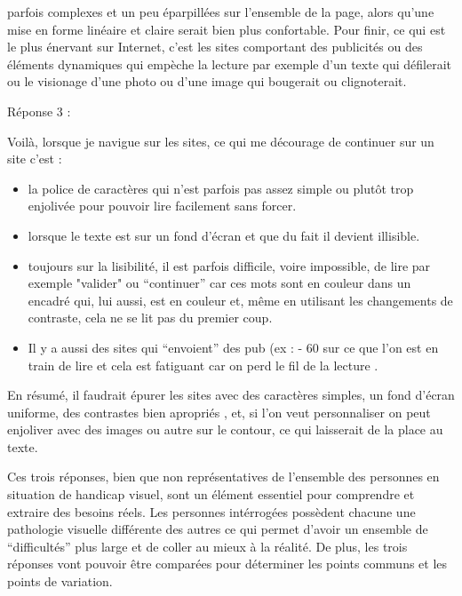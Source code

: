\documentclass[french,a4paper]{report}
\begin{document}
{\begin{center}
{\begin{minipage}{0.9\textwidth}
parfois complexes et un peu éparpillées sur l'ensemble de la
page, alors qu'une mise en forme linéaire et claire serait bien
plus confortable. Pour finir, ce qui est le plus énervant sur
Internet, c'est les sites comportant des publicités ou des
éléments dynamiques qui empèche la lecture par exemple d'un
texte qui défilerait ou le visionage d'une photo ou d'une image
qui bougerait ou clignoterait.
\end{minipage}}
\end{center}
\vspace{0.6cm}
Réponse 3 :
\begin{center}
\colorbox{bck1}{\begin{minipage}{0.9\textwidth} Voilà, lorsque je
navigue sur les sites, ce qui me décourage de continuer sur un
site c'est :
\begin{itemize}\setlength{\itemsep}{0.4\baselineskip}
\item la police de caractères qui n'est parfois pas assez simple ou
plutôt trop enjolivée pour pouvoir lire facilement sans forcer.
\item lorsque le texte est sur un fond d'écran et que du fait il
devient illisible.
\item toujours sur la lisibilité, il est parfois difficile, voire
impossible, de lire par exemple "valider" ou \enquote{continuer} car ces mots
sont en couleur dans un encadré qui, lui aussi, est en couleur et,
même en utilisant les changements de contraste, cela ne se lit pas
du premier coup.
\item Il y a aussi des sites qui \enquote{envoient} des pub (ex : -
60%
sur ce que l'on est en train de lire et cela est fatiguant car on perd le fil de la lecture .\\
\end{itemize}
En résumé, il faudrait épurer les sites avec des caractères simples,
un fond d'écran uniforme, des contrastes bien apropriés , et, si l'on
veut personnaliser on peut enjoliver avec des images ou autre sur le
contour, ce qui laisserait de la place au texte.
\end{minipage}}
\end{center}
\vspace{0.6cm} Ces trois réponses, bien que non représentatives de
l'ensemble des personnes en situation de handicap visuel, sont un élément
essentiel pour comprendre et extraire des besoins réels. Les
personnes intérrogées possèdent chacune une pathologie visuelle
différente des autres ce qui permet d'avoir un ensemble de
\enquote{difficultés} plus large et de coller au mieux à la réalité. De plus,
les trois réponses vont pouvoir être comparées pour déterminer les
points communs et les points de variation.
}
\end{document}
